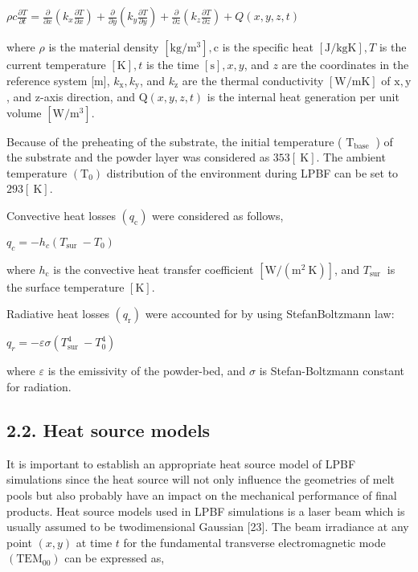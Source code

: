 \documentclass[10pt]{article}
\begin{document}
$\rho c \frac{\partial T}{\partial t}=\frac{\partial}{\partial x}\left(k_{x} \frac{\partial T}{\partial x}\right)+\frac{\partial}{\partial y}\left(k_{y} \frac{\partial T}{\partial y}\right)+\frac{\partial}{\partial z}\left(k_{z} \frac{\partial T}{\partial z}\right)+Q(x, y, z, t)$

where $\rho$ is the material density $\left[\mathrm{kg} / \mathrm{m}^{3}\right], \mathrm{c}$ is the specific heat $[\mathrm{J} / \mathrm{kgK}], T$ is the current temperature $[\mathrm{K}], t$ is the time $[\mathrm{s}], x, y$, and $z$ are the coordinates in the reference system [m], $k_{\mathrm{x}}, k_{\mathrm{y}}$, and $k_{\mathrm{z}}$ are the thermal conductivity $[\mathrm{W} / \mathrm{mK}]$ of $\mathrm{x}, \mathrm{y}$, and $\mathrm{z}$-axis direction, and $\mathrm{Q}(x, y, z, t)$ is the internal heat generation per unit volume $\left[\mathrm{W} / \mathrm{m}^{3}\right]$.

Because of the preheating of the substrate, the initial temperature ( $\mathrm{T}_{\text {base }}$ ) of the substrate and the powder layer was considered as $353[\mathrm{~K}]$. The ambient temperature $\left(\mathrm{T}_{0}\right)$ distribution of the environment during LPBF can be set to $293[\mathrm{~K}]$.

Convective heat losses $\left(q_{\mathrm{c}}\right)$ were considered as follows,

$q_{c}=-h_{c}\left(T_{\text {sur }}-T_{0}\right)$

where $h_{\mathrm{c}}$ is the convective heat transfer coefficient $\left[\mathrm{W} /\left(\mathrm{m}^{2} \mathrm{~K}\right)\right]$, and $T_{\text {sur }}$ is the surface temperature $[\mathrm{K}]$.

Radiative heat losses $\left(q_{\mathrm{r}}\right)$ were accounted for by using StefanBoltzmann law:

$q_{r}=-\varepsilon \sigma\left(T_{\text {sur }}^{4}-T_{0}^{4}\right)$

where $\varepsilon$ is the emissivity of the powder-bed, and $\sigma$ is Stefan-Boltzmann constant for radiation.

\subsection*{2.2. Heat source models}
It is important to establish an appropriate heat source model of LPBF simulations since the heat source will not only influence the geometries of melt pools but also probably have an impact on the mechanical performance of final products. Heat source models used in LPBF simulations is a laser beam which is usually assumed to be twodimensional Gaussian [23]. The beam irradiance at any point $(x, y)$ at time $t$ for the fundamental transverse electromagnetic mode $\left(\mathrm{TEM}_{00}\right)$ can be expressed as,
\end{document}
